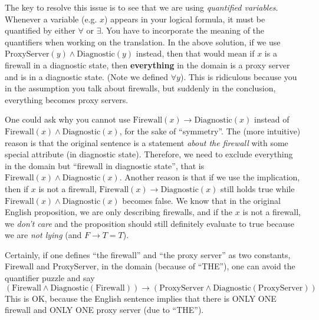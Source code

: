 \documentclass[10pt]{article}
\newcommand{\mapto}{\rightarrow}
\begin{document}
\begin{enumerate}[label=(\alph*)]
\qquad The key to resolve this issue is to see that we are using \emph{quantified variables}. Whenever a variable (e.g. $x$) appears in your logical formula, it must be quantified by either $\forall$ or $\exists$. You have to incorporate the meaning of the quantifiers when working on the translation. In the above solution, if we use $\text{ProxyServer}(y)\land\text{Diagnostic}(y)$ instead, then that would mean if $x$ is a firewall in a diagnostic state, then \textbf{everything} in the domain is a proxy server and is in a diagnostic state. (Note we defined $\forall y$). This is ridiculous because you in the assumption you talk about firewalls, but suddenly in the conclusion, everything becomes proxy servers.

\qquad One could ask why you cannot use $\text{Firewall}(x)\mapto\text{Diagnostic}(x)$ instead of $\text{Firewall}(x)\land\text{Diagnostic}(x)$, for the sake of ``symmetry''. The (more intuitive) reason is that the original sentence is a statement \emph{about the firewall} with some special attribute (in diagnostic state). Therefore, we need to exclude everything in the domain but ``firewall in diagnostic state'', that is $\text{Firewall}(x)\land\text{Diagnostic}(x)$. Another reason is that if we use the implication, then if $x$ is not a firewall, $\text{Firewall}(x)\mapto\text{Diagnostic}(x)$ still holds true while $\text{Firewall}(x)\land\text{Diagnostic}(x)$ becomes false. We know that in the original English proposition, we are only describing firewalls, and if the $x$ is not a firewall, we \emph{don't care} and the proposition should still definitely evaluate to true because we are \emph{not lying} (and $F\mapto T=T$).


\qquad Certainly, if one defines ``the firewall'' and ``the proxy server'' as two constants, Firewall and ProxyServer, in the domain (because of ``THE''), one can avoid the quantifier puzzle and say
\begin{equation}
  (\text{Firewall} \land \text{Diagnostic}(\text{Firewall}))\mapto (\text{ProxyServer}\land\text{Diagnostic}(\text{ProxyServer}))
\end{equation}
This is OK, because the English sentence implies that there is ONLY ONE firewall and ONLY ONE proxy server (due to ``THE'').


\end{enumerate}
\end{document}
